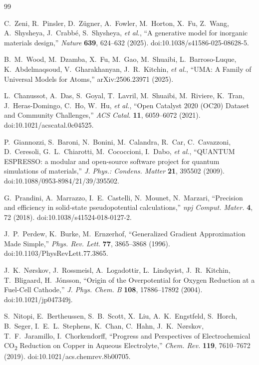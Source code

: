 \documentclass[11pt,a4paper]{report}
\begin{document}
\begin{thebibliography}{99}
\setlength{\itemsep}{2pt}

 C.~Zeni, R.~Pinsler, D.~Z\"ugner, A.~Fowler, M.~Horton, X.~Fu, Z.~Wang,
A.~Shysheya, J.~Crabb\'e, S.~Shysheya, \emph{et al.},
``A generative model for inorganic materials design,''
\emph{Nature} \textbf{639}, 624--632 (2025). doi:10.1038/s41586-025-08628-5.

 B.~M.~Wood, M.~Dzamba, X.~Fu, M.~Gao, M.~Shuaibi, L.~Barroso-Luque,
K.~Abdelmaqsoud, V.~Gharakhanyan, J.~R.~Kitchin, \emph{et al.},
``UMA: A Family of Universal Models for Atoms,'' arXiv:2506.23971 (2025).

 L.~Chanussot, A.~Das, S.~Goyal, T.~Lavril, M.~Shuaibi, M.~Riviere,
K.~Tran, J.~Heras-Domingo, C.~Ho, W.~Hu, \emph{et al.},
``Open Catalyst 2020 (OC20) Dataset and Community Challenges,''
\emph{ACS Catal.} \textbf{11}, 6059--6072 (2021). doi:10.1021/acscatal.0c04525.

 P.~Giannozzi, S.~Baroni, N.~Bonini, M.~Calandra, R.~Car, C.~Cavazzoni,
D.~Ceresoli, G.~L.~Chiarotti, M.~Cococcioni, I.~Dabo, \emph{et al.},
``QUANTUM ESPRESSO: a modular and open-source software project for quantum simulations of
materials,'' \emph{J. Phys.: Condens. Matter} \textbf{21}, 395502 (2009).
doi:10.1088/0953-8984/21/39/395502.

 G.~Prandini, A.~Marrazzo, I.~E.~Castelli, N.~Mounet, N.~Marzari,
``Precision and efficiency in solid-state pseudopotential calculations,''
\emph{npj Comput. Mater.} \textbf{4}, 72 (2018). doi:10.1038/s41524-018-0127-2.

 J.~P.~Perdew, K.~Burke, M.~Ernzerhof,
``Generalized Gradient Approximation Made Simple,''
\emph{Phys. Rev. Lett.} \textbf{77}, 3865--3868 (1996). doi:10.1103/PhysRevLett.77.3865.

 J.~K.~N\o{}rskov, J.~Rossmeisl, A.~Logadottir, L.~Lindqvist,
J.~R.~Kitchin, T.~Bligaard, H.~J\'onsson,
``Origin of the Overpotential for Oxygen Reduction at a Fuel-Cell Cathode,''
\emph{J. Phys. Chem. B} \textbf{108}, 17886--17892 (2004). doi:10.1021/jp047349j.

 S.~Nitopi, E.~Bertheussen, S.~B.~Scott, X.~Liu, A.~K.~Engstfeld, S.~Horch,
B.~Seger, I.~E.~L.~Stephens, K.~Chan, C.~Hahn, J.~K.~N\o{}rskov, T.~F.~Jaramillo, I.~Chorkendorff,
``Progress and Perspectives of Electrochemical CO\textsubscript{2} Reduction on Copper in Aqueous
Electrolyte,'' \emph{Chem. Rev.} \textbf{119}, 7610--7672 (2019).
doi:10.1021/acs.chemrev.8b00705.


\end{thebibliography}
\end{document}
